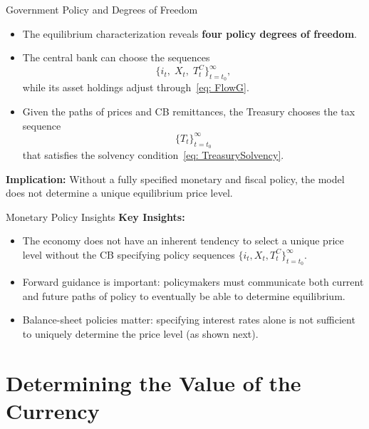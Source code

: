 \documentclass[11pt,aspectratio=169]{beamer}
\begin{document}
\begin{frame}{Government Policy and Degrees of Freedom}
\small

\begin{itemize}
  \item The equilibrium characterization reveals \textbf{four policy degrees of freedom}.
  
  \vspace{0.2cm}
  \item The central bank can choose the sequences
  \[
  \{i_t,\;X_t,\;T_t^{C}\}_{t=t_0}^{\infty},
  \]
  while its asset holdings adjust through~\eqref{eq: FlowG}.
  
  \vspace{0.2cm}
  \item Given the paths of prices and CB remittances, the Treasury chooses the tax sequence
  \[
  \{T_t\}_{t=t_0}^{\infty}
  \]
  that satisfies the solvency condition~\eqref{eq: TreasurySolvency}.
\end{itemize}

\vspace{0.2cm}
\textbf{Implication:}  
Without a fully specified monetary and fiscal policy, the model does not determine a unique equilibrium price level.

\end{frame}


\begin{frame}{Monetary Policy Insights}
\textbf{Key Insights:}
\begin{itemize}
    \item The economy does not have an inherent tendency to select a unique price level without the CB specifying policy sequences $\{i_t, X_t, T_t^C\}_{t=t_0}^\infty$.
    \vspace{0.3cm}
    \item Forward guidance is important: policymakers must communicate both current and future paths of policy to eventually be able to determine equilibrium.
    \vspace{0.3cm}
    \item Balance-sheet policies matter: specifying interest rates alone is not sufficient to uniquely determine the price level (as shown next).
\end{itemize}
\end{frame}

\section{Determining the Value of the Currency}
\end{document}
